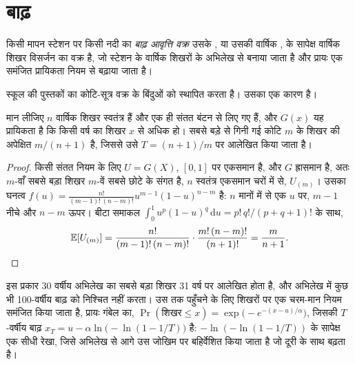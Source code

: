 \section{बाढ़}\label{sec:b2:geological-hazards:floods}

\begin{definition}[बाढ़ आवृत्ति वक्र]\label{def:b2:geological-hazards:flood}
किसी मापन स्टेशन पर किसी नदी का \emph{बाढ़ आवृत्ति वक्र}
उसके , या उसकी वार्षिक , के सापेक्ष वार्षिक शिखर विसर्जन का
वक्र है, जो स्टेशन के वार्षिक शिखरों के अभिलेख से बनाया जाता है और प्रायः एक समंजित
प्रायिकता नियम से बढ़ाया जाता है।
\end{definition}

स्कूल की पुस्तकों का कोटि-सूत्र वक्र के बिंदुओं को स्थापित करता है। उसका एक कारण है।

\begin{proposition}[वाइबुल आलेखन स्थिति]\label{prop:b2:geological-hazards:weibull}
मान लीजिए $n$ वार्षिक शिखर स्वतंत्र हैं और एक ही संतत बंटन से लिए गए हैं, और
$G(x)$ यह प्रायिकता है कि किसी वर्ष का शिखर $x$ से अधिक हो। सबसे बड़े से गिनी गई कोटि $m$ के
शिखर की अपेक्षित  $m/(n + 1)$ है, जिससे उसे $T = (n +
1)/m$ पर आलेखित किया जाता है।
\end{proposition}

\begin{proof}
किसी संतत नियम के लिए $U = G(X)$, $[0, 1]$ पर एकसमान है, और $G$ ह्रासमान है, अतः
$m$-वाँ सबसे बड़ा शिखर $m$-वें सबसे छोटे के संगत है, $n$ स्वतंत्र एकसमान चरों में से,
$U_{(m)}$। उसका घनत्व $f(u) = \frac{n!}{(m-1)!\,(n-m)!}u^{m-1}(1-u)^{n-m}$ है: $n$ मानों में से एक
$u$ पर, $m - 1$ नीचे और $n - m$ ऊपर। बीटा समाकल $\int_0^1 u^{p}(1-u)^{q}\,\mathrm{d}u
= p!\,q!/(p + q + 1)!$ के साथ,
\begin{equation*}
\mathbb{E}[U_{(m)}] = \frac{n!}{(m-1)!\,(n-m)!}\cdot\frac{m!\,(n-m)!}{(n+1)!} = \frac{m}{n+1}. \qedhere
\end{equation*}
\end{proof}

इस प्रकार 30 वर्षीय अभिलेख का सबसे बड़ा शिखर 31 वर्ष पर आलेखित होता है, और अभिलेख में कुछ भी
100-वर्षीय बाढ़ को निश्चित नहीं करता। उस तक पहुँचने के लिए शिखरों पर एक चरम-मान नियम समंजित किया जाता है, प्रायः गंबेल का,
$\Pr(\text{शिखर} \leq x) = \exp\bigl(-e^{-(x - u)/\alpha}\bigr)$, जिसकी $T$-वर्षीय बाढ़ $x_T = u
- \alpha\ln\bigl(-\ln(1 - 1/T)\bigr)$ है: $-\ln(-\ln(1 - 1/T))$ के सापेक्ष एक सीधी रेखा, जिसे
अभिलेख से आगे उस जोखिम पर बहिर्वेशित किया जाता है जो दूरी के साथ बढ़ता है।

